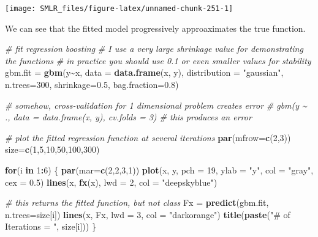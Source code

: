 \documentclass[
]{book}
\newenvironment{Shaded}{\begin{snugshade}}{\end{snugshade}}
\newcommand{\AttributeTok}[1]{\textcolor[rgb]{0.13,0.29,0.53}{#1}}
\newcommand{\CommentTok}[1]{\textcolor[rgb]{0.56,0.35,0.01}{\textit{#1}}}
\newcommand{\ControlFlowTok}[1]{\textcolor[rgb]{0.13,0.29,0.53}{\textbf{#1}}}
\newcommand{\DecValTok}[1]{\textcolor[rgb]{0.00,0.00,0.81}{#1}}
\newcommand{\FloatTok}[1]{\textcolor[rgb]{0.00,0.00,0.81}{#1}}
\newcommand{\FunctionTok}[1]{\textcolor[rgb]{0.13,0.29,0.53}{\textbf{#1}}}
\newcommand{\NormalTok}[1]{#1}
\newcommand{\OtherTok}[1]{\textcolor[rgb]{0.56,0.35,0.01}{#1}}
\newcommand{\SpecialCharTok}[1]{\textcolor[rgb]{0.81,0.36,0.00}{\textbf{#1}}}
\newcommand{\StringTok}[1]{\textcolor[rgb]{0.31,0.60,0.02}{#1}}
\theoremstyle{definition}
\theoremstyle{definition}
\theoremstyle{definition}
\theoremstyle{definition}
\theoremstyle{remark}
\begin{document}
\begin{center}\texttt{[image: SMLR\_files/figure-latex/unnamed-chunk-251-1]} \end{center}

We can see that the fitted model progressively approaximates the true function.

\begin{Shaded}
\begin{Highlighting}[]
  \CommentTok{\# fit regression boosting}
  \CommentTok{\# I use a very large shrinkage value for demonstrating the functions}
  \CommentTok{\# in practice you should use 0.1 or even smaller values for stability}
\NormalTok{  gbm.fit }\OtherTok{=} \FunctionTok{gbm}\NormalTok{(y}\SpecialCharTok{\textasciitilde{}}\NormalTok{x, }\AttributeTok{data =} \FunctionTok{data.frame}\NormalTok{(x, y), }\AttributeTok{distribution =} \StringTok{"gaussian"}\NormalTok{,}
                \AttributeTok{n.trees=}\DecValTok{300}\NormalTok{, }\AttributeTok{shrinkage=}\FloatTok{0.5}\NormalTok{, }\AttributeTok{bag.fraction=}\FloatTok{0.8}\NormalTok{)}

  \CommentTok{\# somehow, cross{-}validation for 1 dimensional problem creates error}
  \CommentTok{\# gbm(y \textasciitilde{} ., data = data.frame(x, y), cv.folds = 3) \# this produces an error  }
  
  \CommentTok{\# plot the fitted regression function at several iterations}
  \FunctionTok{par}\NormalTok{(}\AttributeTok{mfrow=}\FunctionTok{c}\NormalTok{(}\DecValTok{2}\NormalTok{,}\DecValTok{3}\NormalTok{))}
\NormalTok{  size}\OtherTok{=}\FunctionTok{c}\NormalTok{(}\DecValTok{1}\NormalTok{,}\DecValTok{5}\NormalTok{,}\DecValTok{10}\NormalTok{,}\DecValTok{50}\NormalTok{,}\DecValTok{100}\NormalTok{,}\DecValTok{300}\NormalTok{)}
  
  \ControlFlowTok{for}\NormalTok{(i }\ControlFlowTok{in} \DecValTok{1}\SpecialCharTok{:}\DecValTok{6}\NormalTok{)}
\NormalTok{  \{}
    \FunctionTok{par}\NormalTok{(}\AttributeTok{mar=}\FunctionTok{c}\NormalTok{(}\DecValTok{2}\NormalTok{,}\DecValTok{2}\NormalTok{,}\DecValTok{3}\NormalTok{,}\DecValTok{1}\NormalTok{))}
    \FunctionTok{plot}\NormalTok{(x, y, }\AttributeTok{pch =} \DecValTok{19}\NormalTok{, }\AttributeTok{ylab =} \StringTok{"y"}\NormalTok{, }\AttributeTok{col =} \StringTok{"gray"}\NormalTok{, }\AttributeTok{cex =} \FloatTok{0.5}\NormalTok{)}
    \FunctionTok{lines}\NormalTok{(x, }\FunctionTok{fx}\NormalTok{(x), }\AttributeTok{lwd =} \DecValTok{2}\NormalTok{, }\AttributeTok{col =} \StringTok{"deepskyblue"}\NormalTok{)}
    
    \CommentTok{\# this returns the fitted function, but not class}
\NormalTok{    Fx }\OtherTok{=} \FunctionTok{predict}\NormalTok{(gbm.fit, }\AttributeTok{n.trees=}\NormalTok{size[i])}
    \FunctionTok{lines}\NormalTok{(x, Fx, }\AttributeTok{lwd =} \DecValTok{3}\NormalTok{, }\AttributeTok{col =} \StringTok{"darkorange"}\NormalTok{)}
    \FunctionTok{title}\NormalTok{(}\FunctionTok{paste}\NormalTok{(}\StringTok{"\# of Iterations = "}\NormalTok{, size[i]))}
\NormalTok{  \}}
\end{Highlighting}
\end{Shaded}
\end{document}
